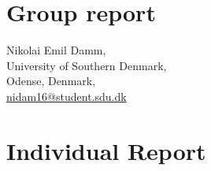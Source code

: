 
\section{Group report}














\newpage
\begin{center}
    {\Large Nikolai Emil Damm,}\\
    University of Southern Denmark,\\
    Odense, Denmark,\\
    \href{mailto:nidam16@student.sdu.dk}{nidam16@student.sdu.dk}
\end{center}
\vspace{0.9pt}

\section{Individual Report}















